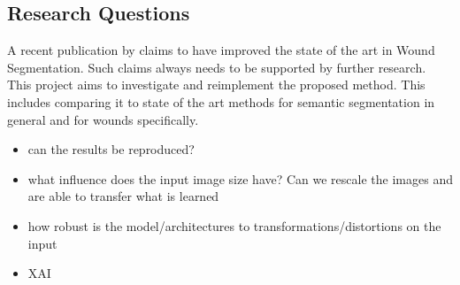 %


\subsection{Research Questions}

A recent publication by \citeauthor{Oota_2023_WACV} claims to have improved the state of the art in Wound Segmentation. Such claims always needs to be supported by further research. This project aims to investigate and reimplement the proposed method. This includes comparing it to state of the art methods for semantic segmentation in general and for wounds specifically. 
\begin{itemize}
	\item can the results be reproduced?
	\item what influence does the input image size have? Can we rescale the images and are able to transfer what is learned
	\item how robust is the model/architectures to transformations/distortions on the input
	\item XAI
\end{itemize}